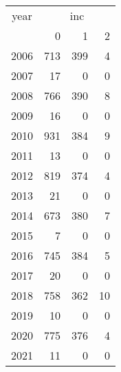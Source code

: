 \footnotesize\begin{tabular}[t]{lrrr}
\toprule
\multicolumn{1}{c}{year} & \multicolumn{3}{c}{inc} \\
\cmidrule(l{3pt}r{3pt}){1-1} \cmidrule(l{3pt}r{3pt}){2-4}
  & 0 & 1 & 2\\
\midrule
2006 & 713 & 399 & 4\\
2007 & 17 & 0 & 0\\
2008 & 766 & 390 & 8\\
2009 & 16 & 0 & 0\\
2010 & 931 & 384 & 9\\
2011 & 13 & 0 & 0\\
2012 & 819 & 374 & 4\\
2013 & 21 & 0 & 0\\
2014 & 673 & 380 & 7\\
2015 & 7 & 0 & 0\\
2016 & 745 & 384 & 5\\
2017 & 20 & 0 & 0\\
2018 & 758 & 362 & 10\\
2019 & 10 & 0 & 0\\
2020 & 775 & 376 & 4\\
2021 & 11 & 0 & 0\\
\bottomrule
\end{tabular}
